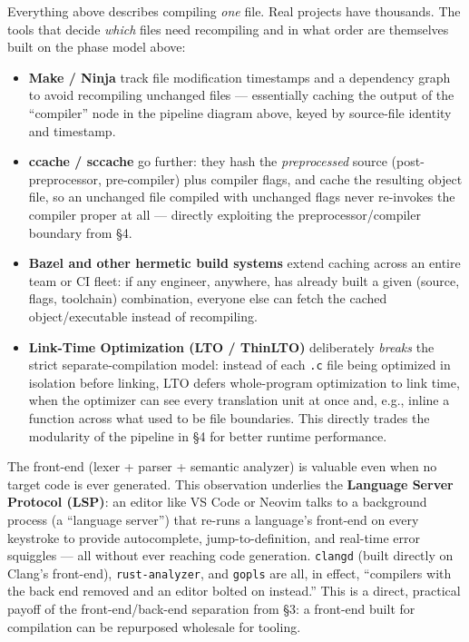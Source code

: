 \documentclass[11pt]{article}
\begin{document}
\begin{enrichment}
Everything above describes compiling \emph{one} file. Real projects have thousands. The tools
that decide \emph{which} files need recompiling and in what order are themselves built on the
phase model above:
\begin{itemize}
  \item \textbf{Make / Ninja} track file modification timestamps and a dependency graph to
  avoid recompiling unchanged files --- essentially caching the output of the ``compiler'' node
  in the pipeline diagram above, keyed by source-file identity and timestamp.
  \item \textbf{ccache / sccache} go further: they hash the \emph{preprocessed} source
  (post-preprocessor, pre-compiler) plus compiler flags, and cache the resulting object file, so
  an unchanged file compiled with unchanged flags never re-invokes the compiler proper at all ---
  directly exploiting the preprocessor/compiler boundary from \S4.
  \item \textbf{Bazel and other hermetic build systems} extend caching across an entire team or
  CI fleet: if any engineer, anywhere, has already built a given (source, flags, toolchain)
  combination, everyone else can fetch the cached object/executable instead of recompiling.
  \item \textbf{Link-Time Optimization (LTO / ThinLTO)} deliberately \emph{breaks} the strict
  separate-compilation model: instead of each \texttt{.c} file being optimized in isolation
  before linking, LTO defers whole-program optimization to link time, when the optimizer can see
  every translation unit at once and, e.g., inline a function across what used to be file
  boundaries. This directly trades the modularity of the pipeline in \S4 for better runtime
  performance.
\end{itemize}
\end{enrichment}

\begin{enrichment}
The front-end (lexer + parser + semantic analyzer) is valuable even when no target code is ever
generated. This observation underlies the \textbf{Language Server Protocol (LSP)}: an editor
like VS Code or Neovim talks to a background process (a ``language server'') that re-runs a
language's front-end on every keystroke to provide autocomplete, jump-to-definition, and
real-time error squiggles --- all without ever reaching code generation. \texttt{clangd} (built
directly on Clang's front-end), \texttt{rust-analyzer}, and \texttt{gopls} are all, in effect,
``compilers with the back end removed and an editor bolted on instead.'' This is a direct,
practical payoff of the front-end/back-end separation from \S3: a front-end built for compilation
can be repurposed wholesale for tooling.
\end{enrichment}
\end{document}
